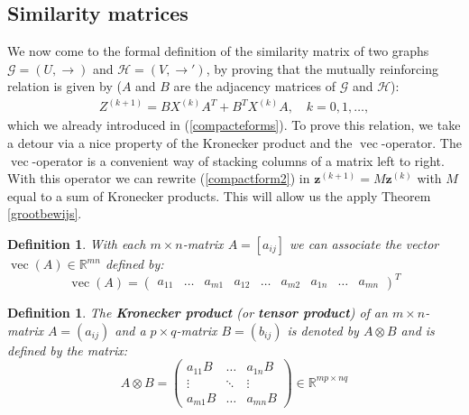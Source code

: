 \documentclass[a4paper,11pt]{report}
\newtheorem{definition}[theorem]{Definition}
\newcommand{\R}{{\mathbb R}}
\newcommand{\graf}{\mathscr{G}}
\newcommand{\grafeen}{\mathscr{H}}
\newcommand{\vect}{\operatorname{vec}}
\begin{document}
\subsection{Similarity matrices}
We now come to the formal definition of the similarity matrix of two graphs $\graf=(U,\to)$ and $\grafeen=(V, \to')$, by proving that the mutually reinforcing relation
is given by ($A$ and $B$ are the adjacency matrices of $\graf$ and $\grafeen$):
 \begin{eqnarray}\label{compactform2}
Z^{(k+1)} = BX^{(k)}A^T + B^TX^{(k)}A,\quad k=0,1,\ldots,
  \end{eqnarray}
which we already introduced in (\ref{compacteforms}). To prove this relation, we take a 
detour via a nice property of the Kronecker product and the $\vect$-operator. The $\vect$-operator
is a convenient way of stacking columns of a matrix left to right. With this operator 
we can rewrite (\ref{compactform2}) in $\mathbf{z}^{(k+1)} = M\mathbf{z}^{(k)}$ with $M$ equal to a sum of Kronecker products. This will 
allow us the apply Theorem \ref{grootbewijs}.
\begin{definition}\label{vectorization}
  With each $m\times n$-matrix $A = [a_{ij}]$ we can associate the vector $\vect(A) \in \R^{mn}$ 
  defined by:
  $$\vect(A) = \begin{pmatrix}
  a_{11} & \ldots & a_{m1} & a_{12} & \ldots & a_{m2} & a_{1n} & \ldots & a_{mn}
  \end{pmatrix}^T$$
\end{definition}

\begin{definition}
  The  \textbf{Kronecker product} (or \textbf{tensor product}) of an $m \times 
  n$-matrix $A = (a_{ij})$ and a $p \times q$-matrix $B = (b_{ij})$ is denoted 
  by $A \otimes B$ and is defined by the matrix:
  $$A \otimes B = \begin{pmatrix}
  a_{11}B & \ldots & a_{1n}B\\
  \vdots & \ddots & \vdots \\
  a_{m1}B & \ldots & a_{mn}B
  \end{pmatrix} \in \R^{mp \times nq}$$
\end{definition}
\end{document}
